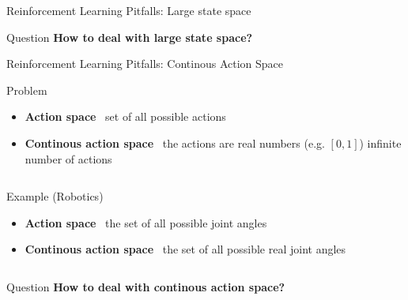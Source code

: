 \documentclass[presentation, 9pt]{beamer}\mode<presentation>{\usetheme{AMSBolognaFC}}
\begin{document}
\begin{frame}{Reinforcement Learning Pitfalls: Large state space}
\begin{alertblock}{Question}
	\centering
	\textbf{How to deal with large state space?}
\end{alertblock}
\end{frame}

\begin{frame}{Reinforcement Learning Pitfalls: Continous Action Space}
	\begin{block}{Problem}
		\begin{itemize}
			\item \textbf{Action space} \faArrowRight \, set of all possible actions
			\item \textbf{Continous action space} \faArrowRight \, the actions are real numbers (e.g. $[0,1]$) \faArrowRight infinite number of actions
		\end{itemize}
	\end{block}
	\begin{columns}
		\begin{column}{0.5\textwidth}
			\begin{block}{Example (Robotics) \, \href{}{\faLink}}
				\begin{itemize}
					\item \textbf{Action space} \faArrowRight \, the set of all possible joint angles
					\item \textbf{Continous action space} \faArrowRight \, the set of all possible real joint angles
				\end{itemize}
			\end{block}
		\end{column}
		\begin{column}{0.5\textwidth}
			\centering
		\end{column}
	\end{columns}
	
	\begin{alertblock}{Question}
		\centering
		\textbf{How to deal with continous action space?}
	\end{alertblock}
\end{frame}
\end{document}
